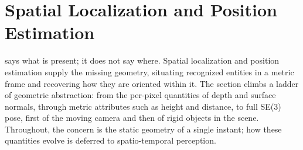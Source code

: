 
\section{Spatial Localization and Position Estimation}
\label{sec:p3-sec6-2-spatial-localization-and-position-estimation}

 says what is present; it does not say where. Spatial localization and position estimation supply the missing geometry, situating recognized entities in a metric frame and recovering how they are oriented within it. The section climbs a ladder of geometric abstraction: from the per-pixel quantities of depth and surface normals, through metric attributes such as height and distance, to full SE(3) pose, first of the moving camera and then of rigid objects in the scene. Throughout, the concern is the static geometry of a single instant; how these quantities evolve is deferred to spatio-temporal perception.











